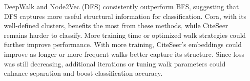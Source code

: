 \documentclass[11pt]{scrartcl}
\begin{document}
DeepWalk and Node2Vec (DFS) consistently outperform BFS, suggesting that DFS captures more useful structural information for classification. Cora, with its well-defined clusters, benefits the most from these methods, while CiteSeer remains harder to classify. More training time or optimized walk strategies could further improve performance. With more training, CiteSeer's embeddings could improve as longer or more frequent walks better capture its structure. Since loss was still decreasing, additional iterations or tuning walk parameters could enhance separation and boost classification accuracy.
\end{document}
